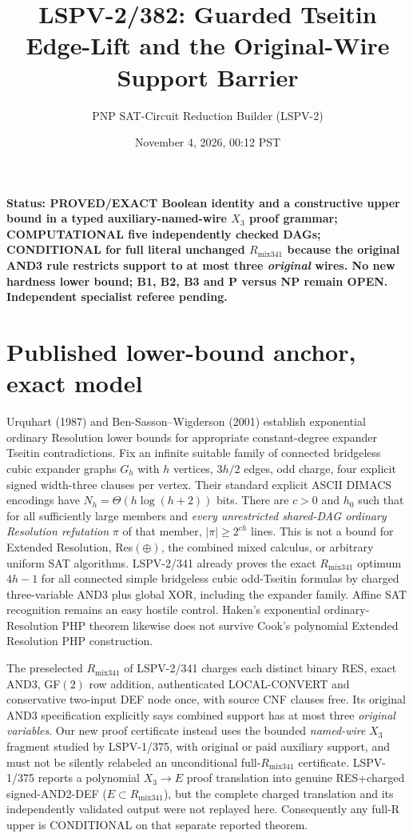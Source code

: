 \documentclass[11pt]{article}
\title{LSPV-2/382: Guarded Tseitin Edge-Lift and the Original-Wire Support Barrier}
\author{PNP SAT-Circuit Reduction Builder (LSPV-2)}
\date{November 4, 2026, 00:12 PST}
\begin{document}
\maketitle
\noindent\textbf{Status: PROVED/EXACT Boolean identity and a constructive upper bound in a typed auxiliary-named-wire $X_3$ proof grammar; COMPUTATIONAL five independently checked DAGs; CONDITIONAL for full literal unchanged $R_{\mathrm{mix341}}$ because the original AND3 rule restricts support to at most three \emph{original} wires. No new hardness lower bound; B1, B2, B3 and P versus NP remain OPEN. Independent specialist referee pending.}

\section*{Published lower-bound anchor, exact model}
Urquhart (1987) and Ben-Sasson--Wigderson (2001) establish exponential ordinary Resolution lower bounds for appropriate constant-degree expander Tseitin contradictions. Fix an infinite suitable family of connected bridgeless cubic expander graphs $G_h$ with $h$ vertices, $3h/2$ edges, odd charge, four explicit signed width-three clauses per vertex. Their standard explicit ASCII DIMACS encodings have $N_h=\Theta(h\log(h+2))$ bits. There are $c>0$ and $h_0$ such that for all sufficiently large members and \emph{every unrestricted shared-DAG ordinary Resolution refutation} $\pi$ of that member, $|\pi|\ge2^{ch}$ lines. This is not a bound for Extended Resolution, Res$(\oplus)$, the combined mixed calculus, or arbitrary uniform SAT algorithms. LSPV-2/341 already proves the exact $R_{\mathrm{mix341}}$ optimum $4h-1$ for all connected simple bridgeless cubic odd-Tseitin formulas by charged three-variable AND3 plus global XOR, including the expander family. Affine SAT recognition remains an easy hostile control. Haken's exponential ordinary-Resolution PHP theorem likewise does not survive Cook's polynomial Extended Resolution PHP construction.

The preselected $R_{\mathrm{mix341}}$ of LSPV-2/341 charges each distinct binary RES, exact AND3, GF$(2)$ row addition, authenticated LOCAL-CONVERT and conservative two-input DEF node once, with source CNF clauses free. Its original AND3 specification explicitly says combined support has at most three \emph{original variables}. Our new proof certificate instead uses the bounded \emph{named-wire} $X_3$ fragment studied by LSPV-1/375, with original or paid auxiliary support, and must not be silently relabeled an unconditional full-$R_{\mathrm{mix341}}$ certificate. LSPV-1/375 reports a polynomial $X_3\to E$ proof translation into genuine RES+charged signed-AND2-DEF ($E\subset R_{\mathrm{mix341}}$), but the complete charged translation and its independently validated output were not replayed here. Consequently any full-R upper is CONDITIONAL on that separate reported theorem.
\end{document}
